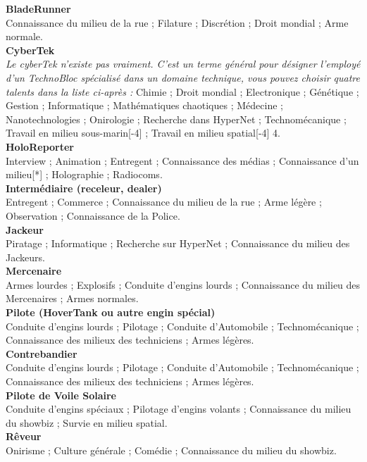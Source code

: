 \documentclass[11pt,twoside,a4paper]{article}
\begin{document}
\begin{multicols*}{2}
{\footnotesize %
\textbf{BladeRunner}~\\
Connaissance du milieu de la rue ; Filature ; Discr{\'e}tion ; Droit mondial ; Arme normale. ~\\
\textbf{CyberTek}~\\
\emph{Le cyberTek n'existe pas vraiment. C'est un terme g{\'e}n{\'e}ral pour d{\'e}signer l'employ{\'e} d'un TechnoBloc sp{\'e}cialis{\'e} dans un domaine technique, vous pouvez choisir quatre talents dans la liste ci-apr{\`e}s : } Chimie ; Droit mondial ; Electronique ; G{\'e}n{\'e}tique ; Gestion ; Informatique ; Math{\'e}matiques chaotiques ; M{\'e}decine ; Nanotechnologies ; Onirologie ; Recherche dans HyperNet ; Technom{\'e}canique ; Travail en milieu sous-marin[-4] ; Travail en milieu spatial[-4]	4. ~\\
\textbf{HoloReporter}~\\
Interview ; Animation ; Entregent ; Connaissance des m{\'e}dias ; Connaissance d'un milieu[*] ; Holographie ; Radiocoms. ~\\
\textbf{Interm{\'e}diaire (receleur, dealer)}~\\
Entregent ; Commerce ; Connaissance du milieu de la rue ; Arme l{\'e}g{\`e}re ; Observation ; Connaissance de la Police. ~\\
\textbf{Jackeur}~\\
Piratage ; Informatique ; Recherche sur HyperNet ; Connaissance du milieu des Jackeurs. ~\\
\textbf{Mercenaire}~\\
Armes lourdes ; Explosifs ; Conduite d'engins lourds ; Connaissance du milieu des Mercenaires ; Armes normales. ~\\
\textbf{Pilote (HoverTank ou autre engin sp{\'e}cial)}~\\
Conduite d'engins lourds ; Pilotage ; Conduite d'Automobile ; Technom{\'e}canique ; Connaissance des milieux des techniciens ; Armes l{\'e}g{\`e}res. ~\\
\textbf{Contrebandier}~\\
Conduite d'engins lourds ; Pilotage ; Conduite d'Automobile ; Technom{\'e}canique ; Connaissance des milieux des techniciens ; Armes l{\'e}g{\`e}res. ~\\
\textbf{Pilote de Voile Solaire}~\\
Conduite d'engins sp{\'e}ciaux ; Pilotage d'engins volants ; Connaissance du milieu du showbiz ; Survie en milieu spatial. ~\\
\textbf{R{\^e}veur}~\\
Onirisme ; Culture g{\'e}n{\'e}rale ; Com{\'e}die ; Connaissance du milieu du showbiz. ~\\
}
\end{multicols*}
\end{document}
